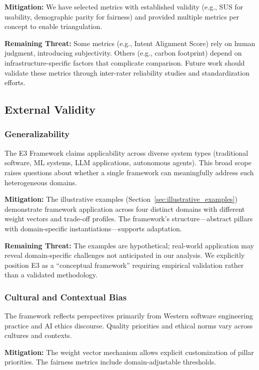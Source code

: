\textbf{Mitigation:} We have selected metrics with established validity (e.g., SUS for usability, demographic parity for fairness) and provided multiple metrics per concept to enable triangulation.

\textbf{Remaining Threat:} Some metrics (e.g., Intent Alignment Score) rely on human judgment, introducing subjectivity. Others (e.g., carbon footprint) depend on infrastructure-specific factors that complicate comparison. Future work should validate these metrics through inter-rater reliability studies and standardization efforts.

\subsection{External Validity}

\subsubsection{Generalizability}

The E3 Framework claims applicability across diverse system types (traditional software, ML systems, LLM applications, autonomous agents). This broad scope raises questions about whether a single framework can meaningfully address such heterogeneous domains.

\textbf{Mitigation:} The illustrative examples (Section~\ref{sec:illustrative_examples}) demonstrate framework application across four distinct domains with different weight vectors and trade-off profiles. The framework's structure—abstract pillars with domain-specific instantiations—supports adaptation.

\textbf{Remaining Threat:} The examples are hypothetical; real-world application may reveal domain-specific challenges not anticipated in our analysis. We explicitly position E3 as a ``conceptual framework'' requiring empirical validation rather than a validated methodology.

\subsubsection{Cultural and Contextual Bias}

The framework reflects perspectives primarily from Western software engineering practice and AI ethics discourse. Quality priorities and ethical norms vary across cultures and contexts.

\textbf{Mitigation:} The weight vector mechanism allows explicit customization of pillar priorities. The fairness metrics include domain-adjustable thresholds.


